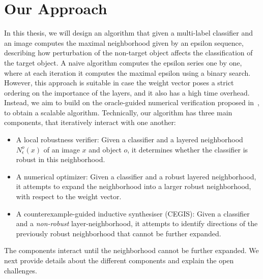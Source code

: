 
\section{Our Approach}

In this thesis, we will design an algorithm that given a multi-label classifier and an image computes the maximal neighborhood given by an epsilon sequence, describing how perturbation of the non-target object affects the classification of the target object.
A naive algorithm computes the epsilon series one by one, where at each iteration it computes the maximal epsilon using a binary search.
However, this approach is suitable in case the weight vector poses a strict ordering on the importance of the layers, and it also has a high time overhead.
Instead, we aim to build on the oracle-guided numerical verification proposed in~\cite{MARVEL}, to obtain a scalable algorithm.
Technically, our algorithm has three main components, that iteratively interact with one another:
\begin{itemize}[nosep,nolistsep]
    \item A local robustness verifier: Given a classifier and a layered neighborhood ${N^{o}_\epsilon}(x)$ of an image $x$ and object $o$, it determines whether the classifier is robust in this neighborhood.
        \item A numerical optimizer: Given a classifier and a robust layered neighborhood, it attempts to expand the neighborhood into a larger robust neighborhood, with respect to the weight vector. %
    \item A counterexample-guided inductive synthesiser (CEGIS): Given a classifier and a \emph{non-robust} layer-neighborhood, it attempts to identify directions of the previously robust neighborhood that cannot be further expanded. 
    \end{itemize}
The components interact until the neighborhood cannot be further expanded.
We next provide details about the different components and explain the open challenges.

